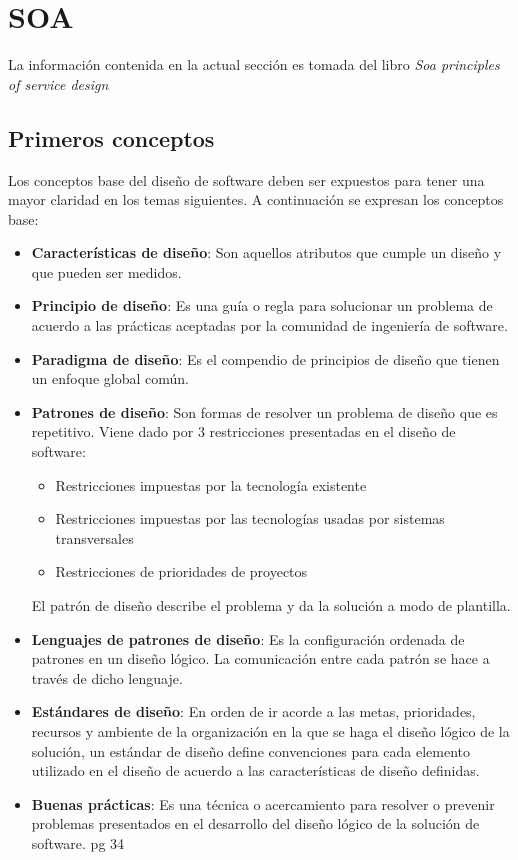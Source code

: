 \section{SOA}

La información contenida en la actual sección es tomada del libro \textit{Soa principles of service design} \cite{soa_principles}

\subsection{Primeros conceptos}

Los conceptos base del diseño de software deben ser expuestos para tener una mayor claridad en los temas siguientes. A continuación se expresan los conceptos base:

\begin{itemize}
  \item \textbf{Características de diseño}: Son aquellos atributos que cumple un diseño y que pueden ser medidos.
  \item \textbf{Principio de diseño}: Es una guía o regla para solucionar un problema de acuerdo a las prácticas aceptadas por la comunidad de ingeniería de software.
  \item \textbf{Paradigma de diseño}: Es el compendio de principios de diseño que tienen un enfoque global común.
  \item \textbf{Patrones de diseño}: Son formas de resolver un problema de diseño que es repetitivo. Viene dado por 3 restricciones presentadas en el diseño de software:
  \begin{itemize}
    \item Restricciones impuestas por la tecnología existente
    \item Restricciones impuestas por las tecnologías usadas por sistemas transversales
    \item Restricciones de prioridades de proyectos
  \end{itemize}
  El patrón de diseño describe el problema y da la solución a modo de plantilla.
  \item \textbf{Lenguajes de patrones de diseño}: Es la configuración ordenada de patrones en un diseño lógico. La comunicación entre cada patrón se hace a través de dicho lenguaje.
  \item \textbf{Estándares de diseño}: En orden de ir acorde a las metas, prioridades, recursos y ambiente de la organización en la que se haga el diseño lógico de la solución, un estándar de diseño define convenciones para cada elemento utilizado en el diseño de acuerdo a las características de diseño definidas.
  \item \textbf{Buenas prácticas}: Es una técnica o acercamiento para resolver o prevenir problemas presentados en el desarrollo del diseño lógico de la solución de software. pg 34
\end{itemize}


